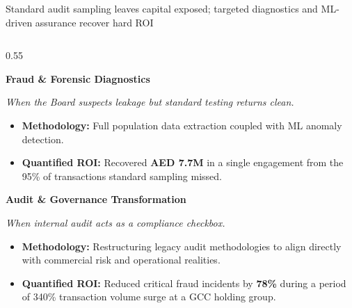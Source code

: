 \documentclass[aspectratio=169, 9pt]{beamer}
\begin{document}
\begin{frame}{Standard audit sampling leaves capital exposed; targeted diagnostics and ML-driven assurance recover hard ROI}
    \vspace{-0.2cm}
    \begin{columns}[T]
        \begin{column}{0.55\textwidth}
            \begin{tcolorbox}[colback=bcgLightGray, colframe=bcgLightGray, arc=0pt, left=3pt, top=1pt, bottom=1pt]
                \textbf{\normalsize \color{bcgGreen} Fraud \& Forensic Diagnostics}
            \end{tcolorbox}
            \textit{\small \color{gray} When the Board suspects leakage but standard testing returns clean.}
            \begin{itemize}
                \item \textbf{Methodology:} Full population data extraction coupled with ML anomaly detection.
                \item \textbf{\color{bcgGreen} Quantified ROI:} Recovered \textbf{AED 7.7M} in a single engagement from the 95\% of transactions standard sampling missed.
            \end{itemize}
            
            \vspace{0.1cm}
            \begin{tcolorbox}[colback=bcgLightGray, colframe=bcgLightGray, arc=0pt, left=3pt, top=1pt, bottom=1pt]
                \textbf{\normalsize \color{bcgGreen} Audit \& Governance Transformation}
            \end{tcolorbox}
            \textit{\small \color{gray} When internal audit acts as a compliance checkbox.}
            \begin{itemize}
                \item \textbf{Methodology:} Restructuring legacy audit methodologies to align directly with commercial risk and operational realities.
                \item \textbf{\color{bcgGreen} Quantified ROI:} Reduced critical fraud incidents by \textbf{78\%} during a period of 340\% transaction volume surge at a GCC holding group.
            \end{itemize}
        \end{column}
        

\end{columns}
\end{frame}
\end{document}
